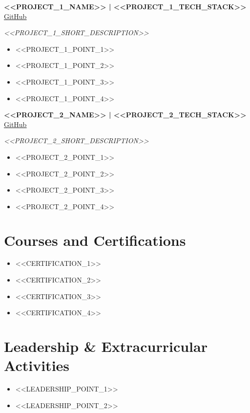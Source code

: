 \documentclass[11pt]{article}
\begin{document}
\textbf{<<PROJECT_1_NAME>> | <<PROJECT_1_TECH_STACK>>}
\hfill
\uline{\href{<<PROJECT_1_GITHUB_URL>>}{GitHub}} \\
\vspace{2pt}

\textit{<<PROJECT_1_SHORT_DESCRIPTION>>}

\vspace{-6pt}

\begin{itemize}[leftmargin=*]
\item <<PROJECT_1_POINT_1>>
\item <<PROJECT_1_POINT_2>>
\item <<PROJECT_1_POINT_3>>
\item <<PROJECT_1_POINT_4>>
\end{itemize}

\vspace{-6pt}

\textbf{<<PROJECT_2_NAME>> | <<PROJECT_2_TECH_STACK>>}
\hfill
\uline{\href{<<PROJECT_2_GITHUB_URL>>}{GitHub}} \\
\vspace{2pt}

\textit{<<PROJECT_2_SHORT_DESCRIPTION>>}

\vspace{-6pt}

\begin{itemize}[leftmargin=*]
\item <<PROJECT_2_POINT_1>>
\item <<PROJECT_2_POINT_2>>
\item <<PROJECT_2_POINT_3>>
\item <<PROJECT_2_POINT_4>>
\end{itemize}

\section*{Courses and Certifications}

\begin{itemize}[leftmargin=*]
\item <<CERTIFICATION_1>>
\item <<CERTIFICATION_2>>
\item <<CERTIFICATION_3>>
\item <<CERTIFICATION_4>>
\end{itemize}

\vspace{-8pt}

\section*{Leadership \& Extracurricular Activities}

\begin{itemize}[leftmargin=*]
\item <<LEADERSHIP_POINT_1>>
\item <<LEADERSHIP_POINT_2>>
\end{itemize}

\vspace{-8pt}
\end{document}
